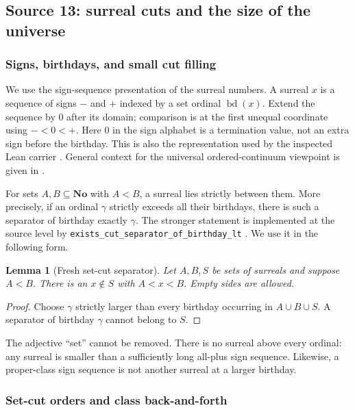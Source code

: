 \documentclass[11pt]{article}
\newtheorem{lemma}[lemma]{Lemma}
\theoremstyle{definition}
\theoremstyle{remark}
\newcommand{\No}{\mathbf{No}}
\newcommand{\bd}{\operatorname{bd}}
\newcommand{\code}[1]{\texttt{\small #1}}
\begin{document}
\subsection{Source 13: surreal cuts and the size of the universe}\label{swo:fs:sec:surreal}

\subsubsection{Signs, birthdays, and small cut filling}

We use the sign-sequence presentation of the surreal numbers. A surreal
$x$ is a sequence of signs $-$ and $+$ indexed by a set ordinal $\bd(x)$.
Extend the sequence by $0$ after its domain; comparison is at the first
unequal coordinate using $-<0<+$. Here $0$ in the sign alphabet is a
termination value, not an extra sign before the birthday. This is also
the representation used by the inspected Lean carrier
\cite{ProveItSigns}. General context for the universal ordered-continuum
viewpoint is given in \cite{Ehrlich2012}.

For sets $A,B\subseteq\No$ with $A<B$, a surreal lies strictly between
them. More precisely, if an ordinal $\gamma$ strictly exceeds all their
birthdays, there is such a separator of birthday exactly $\gamma$.
The stronger statement is implemented at the source level by
\code{exists\_cut\_separator\_of\_birthday\_lt}
\cite{ProveItCutFill}. We use it in the following form.

\begin{lemma}[Fresh set-cut separator]\label{swo:fs:lem:fresh}
Let $A,B,S$ be sets of surreals and suppose $A<B$. There is an
$x\notin S$ with $A<x<B$. Empty sides are allowed.
\end{lemma}
\begin{proof}
Choose $\gamma$ strictly larger than every birthday occurring in
$A\cup B\cup S$. A separator of birthday $\gamma$ cannot belong to $S$.
\end{proof}

The adjective ``set'' cannot be removed. There is no surreal above every
ordinal: any surreal is smaller than a sufficiently long all-plus sign
sequence. Likewise, a proper-class sign sequence is not another surreal
at a larger birthday.

\subsubsection{Set-cut orders and class back-and-forth}
\end{document}
